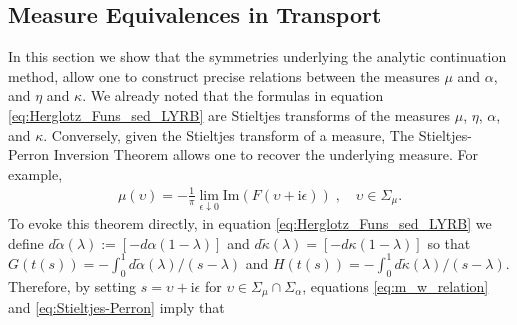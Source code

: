 \documentclass[jmp,graphicx]{revtex4-1}
\newcommand{\I}{\mathrm{i}}
\begin{document}
\subsection{Measure Equivalences in                        
  Transport} \label{sec:Measure_Equivalences}  
%
In this section we show that the symmetries underlying the
analytic continuation method, allow one to construct precise relations
between the measures $\mu$ and $\alpha$, and $\eta$ and $\kappa$. We already noted
that the formulas in equation \eqref{eq:Herglotz_Funs_sed_LYRB} are 
Stieltjes transforms of the measures $\mu$, $\eta$, $\alpha$, and
$\kappa$. Conversely, given the Stieltjes transform of a measure, The 
Stieltjes-Perron Inversion Theorem
\cite{Day:JPCM-96,Henrici:1974:v3,MILTON:2002:TC} allows one to
recover the underlying measure. For example,
%
\begin{align}\label{eq:Stieltjes-Perron}
  \mu(\upsilon)=-\frac{1}{\pi}\lim_{\epsilon\downarrow0}\text{Im}(F(\upsilon+\I\epsilon))\;, \quad
  \upsilon\in\Sigma_\mu. 
\end{align}
%
To evoke this theorem directly, in equation
\eqref{eq:Herglotz_Funs_sed_LYRB} we define 
$d\tilde{\alpha}(\lambda):=[-d\alpha(1-\lambda)]$ and $d\tilde{\kappa}(\lambda)=[-d\kappa(1-\lambda)]$ so that
$G(t(s))=-\int_0^1d\tilde{\alpha}(\lambda)/(s-\lambda)$ and
$H(t(s))=-\int_0^1d\tilde{\kappa}(\lambda)/(s-\lambda)$. Therefore, by setting $s=\upsilon+\I\epsilon$
for $\upsilon\in\Sigma_\mu\cap\Sigma_\alpha$, equations \eqref{eq:m_w_relation} and
\eqref{eq:Stieltjes-Perron} imply that
\end{document}
